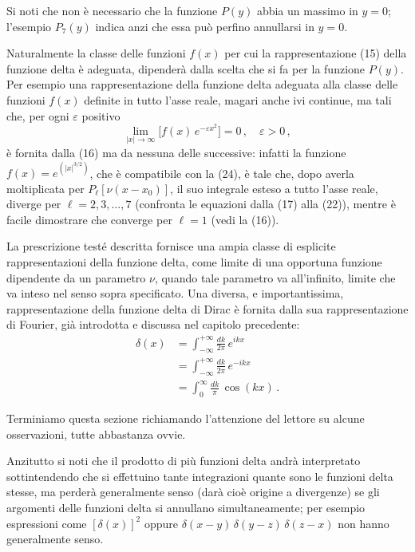 \documentclass[11pt, a4paper]{book}
\numberwithin{equation}{section}
\begin{document}
Si noti che non è necessario che la funzione $P(y)$ abbia un massimo in $y = 0$; l'esempio $P_7(y)$ indica anzi che essa può perfino annullarsi in $y = 0$.

Naturalmente la classe delle funzioni $f(x)$ per cui la rappresentazione (15) della funzione delta è adeguata, dipenderà dalla scelta che si fa per la funzione $P(y)$. Per esempio una rappresentazione della funzione delta adeguata alla classe delle funzioni $f(x)$ definite in tutto l'asse reale, magari anche ivi continue, ma tali che, per ogni $\varepsilon$ positivo
\begin{equation}
\lim_{|x| \to \infty} \bigl[f(x)\, e^{-\varepsilon x^2}\bigr] = 0 \,, \quad \varepsilon > 0 \,, \tag{24}
\end{equation}
è fornita dalla (16) ma da nessuna delle successive: infatti la funzione $f(x) = e^{(|x|^{3/2})}$, che è compatibile con la (24), è tale che, dopo averla moltiplicata per $P_\ell[\nu(x - x_0)]$, il suo integrale esteso a tutto l'asse reale, diverge per $\ell = 2, 3, \ldots, 7$ (confronta le equazioni dalla (17) alla (22)), mentre è facile dimostrare che converge per $\ell = 1$ (vedi la (16)).

La prescrizione testé descritta fornisce una ampia classe di esplicite rappresentazioni della funzione delta, come limite di una opportuna funzione dipendente da un parametro $\nu$, quando tale parametro va all'infinito, limite che va inteso nel senso sopra specificato. Una diversa, e importantissima, rappresentazione della funzione delta di Dirac è fornita dalla sua rappresentazione di Fourier, già introdotta e discussa nel capitolo precedente:
\begin{align}
\delta(x) &= \int_{-\infty}^{+\infty} \frac{dk}{2\pi}\, e^{ikx} \tag{25a} \\
&= \int_{-\infty}^{+\infty} \frac{dk}{2\pi}\, e^{-ikx} \tag{25b} \\
&= \int_{0}^{\infty} \frac{dk}{\pi}\, \cos(kx) \,. \tag{25c}
\end{align}

Terminiamo questa sezione richiamando l'attenzione del lettore su alcune osservazioni, tutte abbastanza ovvie.

Anzitutto si noti che il prodotto di più funzioni delta andrà interpretato sottintendendo che si effettuino tante integrazioni quante sono le funzioni delta stesse, ma perderà generalmente senso (darà cioè origine a divergenze) se gli argomenti delle funzioni delta si annullano simultaneamente; per esempio espressioni come $[\delta(x)]^2$ oppure $\delta(x-y)\,\delta(y-z)\,\delta(z-x)$ non hanno generalmente senso.
\end{document}
